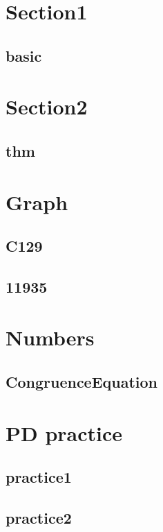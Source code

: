\section{Section1}
    \subsection{basic}
        

\section{Section2}
    \subsection{thm}
        

\section{Graph}
    \subsection{C129}
        
    \subsection{11935}
        

\section{Numbers}
    \subsection{CongruenceEquation}
        

\section{PD practice}
    \subsection{practice1}
        
    \subsection{practice2}
        
        